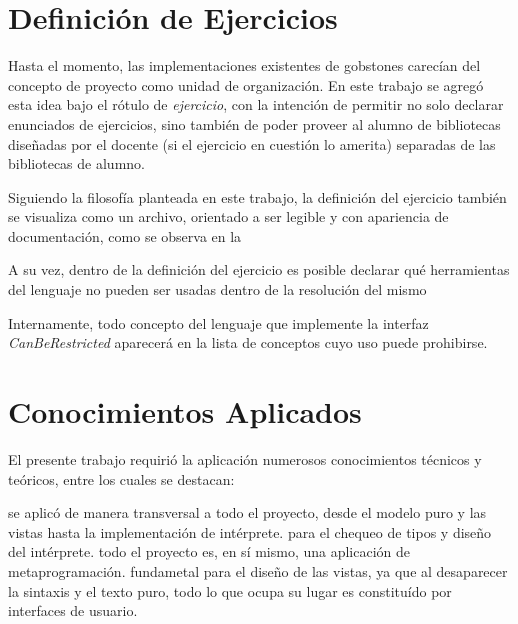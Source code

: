 \centertree{
  [IfElseStatement
    [TrueBlock]
    [empty]
  ]
}

\bigskip

\section{Definición de Ejercicios}\label{proyecto}

Hasta el momento, las implementaciones existentes de gobstones carecían del concepto de proyecto como unidad de organización. En este trabajo se agregó esta idea bajo el rótulo de \emph{ejercicio}, con la intención de permitir no solo declarar enunciados de ejercicios, sino también de poder proveer al alumno de bibliotecas diseñadas por el docente (si el ejercicio en cuestión lo amerita) separadas de las bibliotecas de alumno.

Siguiendo la filosofía planteada en este trabajo, la definición del ejercicio también se visualiza como un archivo, orientado a ser legible y con apariencia de documentación, como se observa en la 


A su vez, dentro de la definición del ejercicio es posible declarar qué herramientas del lenguaje no pueden ser usadas dentro de la resolución del mismo 


Internamente, todo concepto del lenguaje que implemente la interfaz \textit{CanBeRestricted} aparecerá en la lista de conceptos cuyo uso puede prohibirse.


\section{Conocimientos Aplicados}\label{conocimientos}

El presente trabajo requirió la aplicación numerosos conocimientos técnicos y teóricos, entre los cuales se destacan:

\begin{itemize}
   se aplicó de manera transversal a todo el proyecto, desde el modelo puro y las vistas hasta la implementación de intérprete.
   para el chequeo de tipos y diseño del intérprete.
   todo el proyecto es, en sí mismo, una aplicación de metaprogramación.
   fundametal para el diseño de las vistas, ya que al desaparecer la sintaxis y el texto puro, todo lo que ocupa su lugar es constituído por interfaces de usuario.
\end{itemize}


